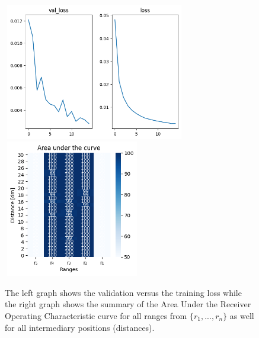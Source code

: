 \begin{multicols}{2}
\end{multicols}\begin{figure}[H]%
\centering
\includegraphics[width=8cm,height=6cm]{3_models/models_6/graph_6.png}
\hspace{0.2 cm}
\includegraphics[width=6cm,height=6cm]{4_plots/plots_6/AUC_6.png}
\caption{The left graph shows the validation versus the training loss while the right graph shows the summary of the Area Under the Receiver Operating Characteristic curve for all ranges from $\{r_{1}, ... ,r_{n}\}$ as well for all intermediary positions (distances).}
\label{auc_6}
\end{figure}


\newpage

